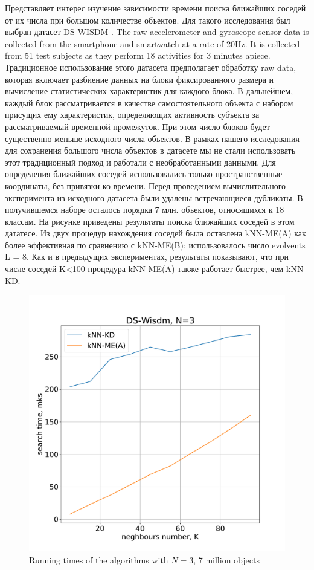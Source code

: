 \documentclass[entropy,article,submit,moreauthors,pdftex]{Definitions/mdpi}
\begin{document}
\begin{paracol}{2}
\textcolor[rgb]{1,0,0}{Представляет интерес изучение зависимости времени поиска ближайших соседей от их числа при большом количестве объектов. Для такого исследования был выбран датасет DS-WISDM \cite{ds-3}. The raw accelerometer and gyroscope sensor data is collected from the smartphone and smartwatch at a rate of 20Hz. It is collected from 51 test subjects as they perform 18 activities for 3 minutes apiece. Традиционное использование этого датасета предполагает обработку raw data, которая включает разбиение данных на блоки фиксированного размера и вычисление статистических характеристик для каждого блока. В дальнейшем, каждый блок рассматривается в качестве самостоятельного объекта с набором присущих ему характеристик, определяющих активность субъекта за рассматриваемый временной промежуток. При этом число блоков будет существенно меньше исходного числа объектов. В рамках нашего исследования для сохранения большого числа объектов в датасете мы не стали использовать этот традиционный подход и работали с необработанными данными. Для определения ближайших соседей использовались только пространственные координаты, без привязки ко времени. Перед проведением вычислительного эксперимента из исходного датасета были удалены встречающиеся дубликаты. В получившемся наборе осталось порядка 7 млн. объектов, относящихся к 18 классам. На рисунке \label{figW} приведены результаты  поиска ближайших соседей в этом дататесе. Из двух процедур нахождения соседей была оставлена kNN-ME(A) как более эффективная по сравнению с kNN-ME(B); использовалось число evolvents L = 8. Как и в предыдущих экспериментах, результаты показывают, что при числе соседей K<100 процедура kNN-ME(A) также работает быстрее, чем kNN-KD.}


\begin{figure}
\widefigure
\includegraphics[width=0.5\linewidth]{figW.pdf}
\caption{Running times of the algorithms with $N = 3$, 7 million objects\label{figW}}
\end{figure}  


\end{paracol}
\end{document}

